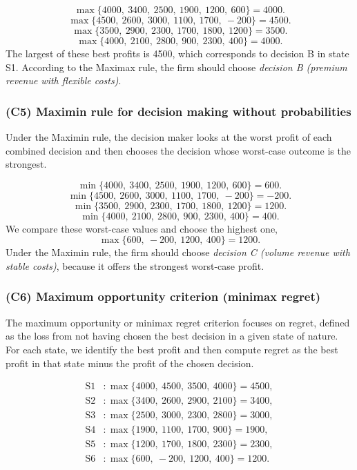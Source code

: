 \[
\max\{4000,\ 3400,\ 2500,\ 1900,\ 1200,\ 600\}=4000.
\]
\[
\max\{4500,\ 2600,\ 3000,\ 1100,\ 1700,\ -200\}=4500.
\]
\[
\max\{3500,\ 2900,\ 2300,\ 1700,\ 1800,\ 1200\}=3500.
\]
\[
\max\{4000,\ 2100,\ 2800,\ 900,\ 2300,\ 400\}=4000.
\]
The largest of these best profits is 4500, which corresponds to decision B in state S1. According to the Maximax rule, the
firm should choose \emph{decision B (premium revenue with flexible costs)}.

\subsubsection{(C5) Maximin rule for decision making without probabilities}\label{subsubsec:example3-c5}

Under the Maximin rule, the decision maker looks at the worst profit of each combined decision and then chooses the
decision whose worst-case outcome is the strongest.

\[
\min\{4000,\ 3400,\ 2500,\ 1900,\ 1200,\ 600\}=600.
\]
\[
\min\{4500,\ 2600,\ 3000,\ 1100,\ 1700,\ -200\}=-200.
\]
\[
\min\{3500,\ 2900,\ 2300,\ 1700,\ 1800,\ 1200\}=1200.
\]
\[
\min\{4000,\ 2100,\ 2800,\ 900,\ 2300,\ 400\}=400.
\]
We compare these worst-case values and choose the highest one,
\[
\max\{600,\ -200,\ 1200,\ 400\}=1200.
\]
Under the Maximin rule, the firm should choose \emph{decision C (volume revenue with stable costs)}, because it offers the
strongest worst-case profit.

\subsubsection{(C6) Maximum opportunity criterion (minimax regret)}\label{subsubsec:example3-c6}

The maximum opportunity or minimax regret criterion focuses on regret, defined as the loss from not having chosen the best
decision in a given state of nature. For each state, we identify the best profit and then compute regret as the best profit
in that state minus the profit of the chosen decision.

\[
\begin{aligned}
\text{S1}&\colon \max\{4000,\ 4500,\ 3500,\ 4000\}=4500,\\
\text{S2}&\colon \max\{3400,\ 2600,\ 2900,\ 2100\}=3400,\\
\text{S3}&\colon \max\{2500,\ 3000,\ 2300,\ 2800\}=3000,\\
\text{S4}&\colon \max\{1900,\ 1100,\ 1700,\ 900\}=1900,\\
\text{S5}&\colon \max\{1200,\ 1700,\ 1800,\ 2300\}=2300,\\
\text{S6}&\colon \max\{600,\ -200,\ 1200,\ 400\}=1200.
\end{aligned}
\]

